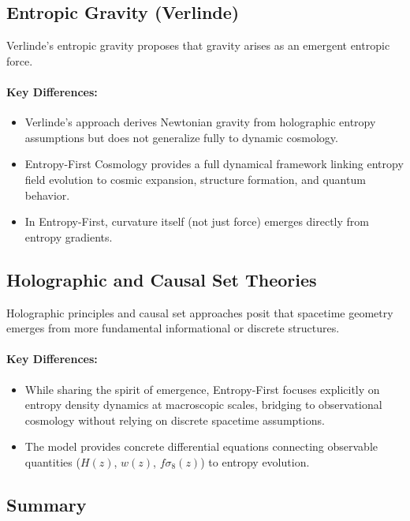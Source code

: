 \documentclass{article}
\begin{document}
\subsection{Entropic Gravity (Verlinde)}

Verlinde's entropic gravity proposes that gravity arises as an emergent entropic force.

\paragraph{Key Differences:}
\begin{itemize}
    \item Verlinde's approach derives Newtonian gravity from holographic entropy assumptions but does not generalize fully to dynamic cosmology.
    \item Entropy-First Cosmology provides a full dynamical framework linking entropy field evolution to cosmic expansion, structure formation, and quantum behavior.
    \item In Entropy-First, curvature itself (not just force) emerges directly from entropy gradients.
\end{itemize}

\subsection{Holographic and Causal Set Theories}

Holographic principles and causal set approaches posit that spacetime geometry emerges from more fundamental informational or discrete structures.

\paragraph{Key Differences:}
\begin{itemize}
    \item While sharing the spirit of emergence, Entropy-First focuses explicitly on entropy density dynamics at macroscopic scales, bridging to observational cosmology without relying on discrete spacetime assumptions.
    \item The model provides concrete differential equations connecting observable quantities ($H(z)$, $w(z)$, $f\sigma_8(z)$) to entropy evolution.
\end{itemize}

\subsection{Summary}
\end{document}
